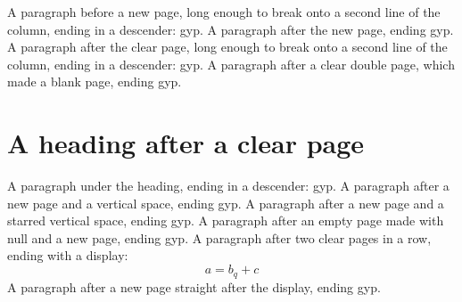 \documentclass[twoside]{article}
\begin{document}
A paragraph before a new page, long enough to break onto a second line of the
column, ending in a descender: gyp.
\newpage
A paragraph after the new page, ending gyp.
\clearpage
A paragraph after the clear page, long enough to break onto a second line of
the column, ending in a descender: gyp.
\cleardoublepage
A paragraph after a clear double page, which made a blank page, ending gyp.
\clearpage
\section{A heading after a clear page}
A paragraph under the heading, ending in a descender: gyp.
\newpage
\vspace{20pt}
A paragraph after a new page and a vertical space, ending gyp.
\newpage
\vspace*{20pt}
A paragraph after a new page and a starred vertical space, ending gyp.
\null\newpage
A paragraph after an empty page made with null and a new page, ending gyp.
\clearpage
\clearpage
A paragraph after two clear pages in a row, ending with a display:
\[ a = b_q + c \]
\newpage
A paragraph after a new page straight after the display, ending gyp.
\end{document}
